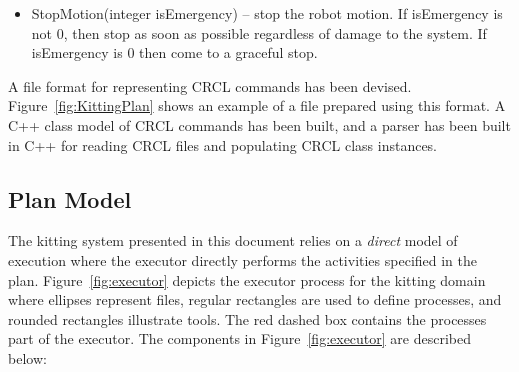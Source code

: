 \begin{itemize}
%

\item \sf StopMotion(integer isEmergency) \rm -- stop the robot motion. If
  \sf isEmergency \rm is not 0, then stop as soon as possible regardless of
  damage to the system. If \sf isEmergency \rm is 0 then come to a graceful
  stop.\\

\end{itemize}

A file format for representing CRCL commands has been devised.
Figure~\ref{fig:KittingPlan} shows an example of a file prepared using this
format. A C++ class model of CRCL commands has been built, and a parser has
been built in C++ for reading CRCL files and populating
CRCL class instances.

\subsection{Plan Model}
The kitting system presented in this document relies on a \textit{direct} model of execution where the executor directly performs the activities specified in the plan. Figure~\ref{fig:executor} depicts the executor process for the kitting domain where ellipses represent files, regular rectangles are used to define processes, and rounded rectangles illustrate tools. The red dashed box contains the processes part of the executor. The components in Figure~\ref{fig:executor} are described below:

